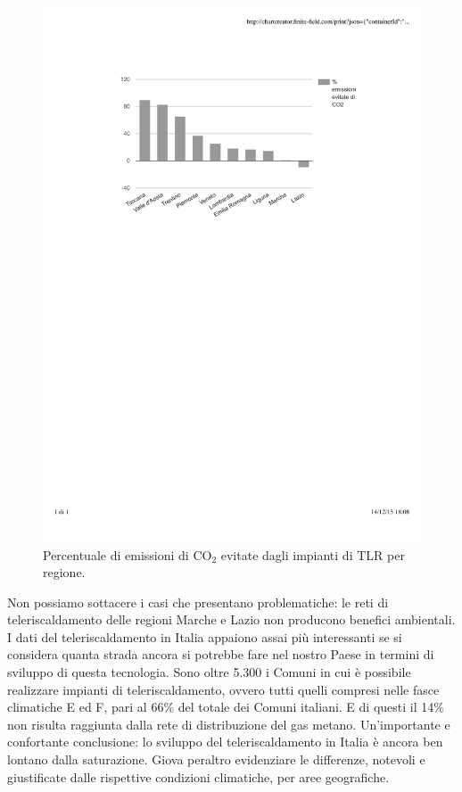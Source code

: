 \documentclass[laurea,oneside,11pt]{USiena_tesiLM}
\begin{document}
\begin{figure}[!ht]
\centering
\includegraphics[width=\textwidth]{figure/CO2} 
\caption{Percentuale di emissioni di CO$_2$ evitate dagli impianti di TLR per regione.}
\label{fig:CO2}
\end{figure}

Non possiamo sottacere i casi che presentano problematiche: le reti di teleriscaldamento delle regioni Marche e Lazio non producono benefici ambientali.\\

I dati del teleriscaldamento in Italia appaiono assai più interessanti se si considera quanta strada ancora si potrebbe fare nel nostro Paese in termini di sviluppo di questa tecnologia. Sono oltre 5.300 i Comuni in cui è possibile realizzare impianti di teleriscaldamento, ovvero tutti quelli compresi nelle fasce climatiche E ed F, pari al 66\% del totale dei Comuni italiani. E di questi il 14\% non risulta raggiunta dalla rete di distribuzione del gas metano. 
Un'importante e confortante conclusione: lo sviluppo del teleriscaldamento in Italia è ancora ben lontano dalla saturazione.
Giova peraltro evidenziare le differenze, notevoli e giustificate dalle rispettive condizioni climatiche, per aree geografiche.\\
\end{document}

